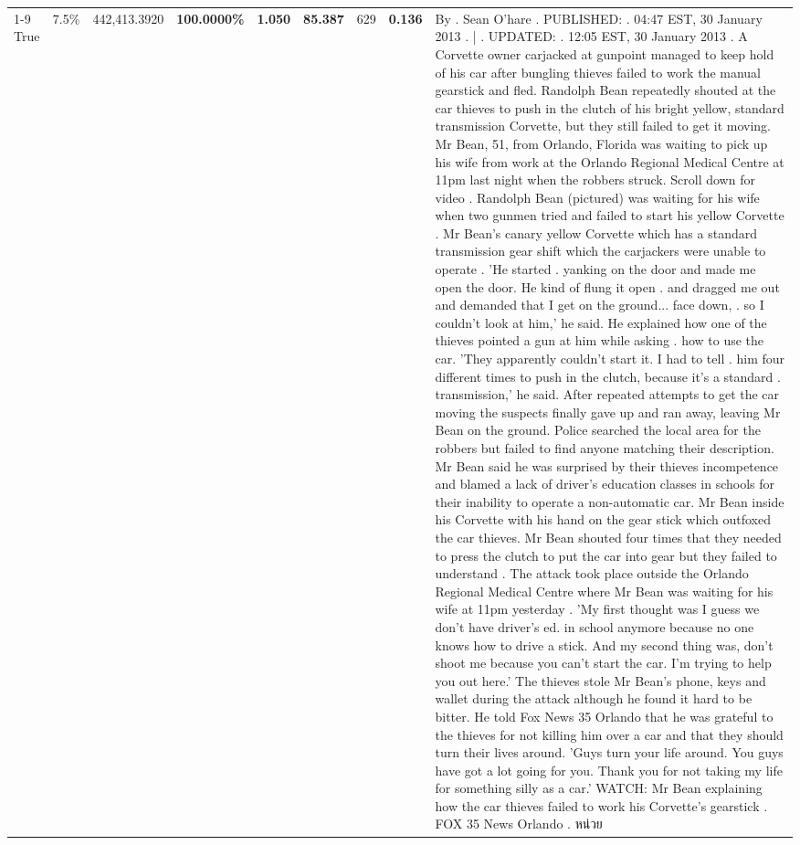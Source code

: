 \begin{table}[H]
\begin{tabular}{lllrlllll}
\cline{1-9} \cline{2-9}
True & 7.5\% & 442,413.3920 & \bfseries \color{red} 100.0000\% & \bfseries \color{red} 1.050 & \bfseries \color{red} 85.387 & 629 & \bfseries \color{red} 0.136 & By . Sean O'hare . PUBLISHED: . 04:47 EST, 30 January 2013 . | . UPDATED: . 12:05 EST, 30 January 2013 . A Corvette owner carjacked at gunpoint managed to keep hold of his car after bungling thieves failed to work the manual gearstick and fled. Randolph Bean repeatedly shouted at the car thieves to push in the clutch of his bright yellow, standard transmission Corvette, but they still failed to get it moving. Mr Bean, 51, from Orlando, Florida was waiting to pick up his wife from work at the Orlando Regional Medical Centre at 11pm last night when the robbers struck. Scroll down for video . Randolph Bean (pictured) was waiting for his wife when two gunmen tried and failed to start his yellow Corvette . Mr Bean's canary yellow Corvette which has a standard transmission gear shift which the carjackers were unable to operate . 'He started . yanking on the door and made me open the door. He kind of flung it open . and dragged me out and demanded that I get on the ground... face down, . so I couldn't look at him,' he said. He explained how one of the thieves pointed a gun at him while asking . how to use the car. 'They apparently couldn't start it. I had to tell . him four different times to push in the clutch, because it's a standard . transmission,' he said. After repeated attempts to get the car moving the suspects finally gave up and ran away, leaving Mr Bean on the ground. Police searched the local area for the robbers but failed to find anyone matching their description. Mr Bean said he was surprised by their thieves incompetence and blamed a lack of driver's education classes in schools for their inability to operate a non-automatic car. Mr Bean inside his Corvette with his hand on the gear stick which outfoxed the car thieves. Mr Bean shouted four times that they needed to press the clutch to put the car into gear but they failed to understand . The attack took place outside the Orlando Regional Medical Centre where Mr Bean was waiting for his wife at 11pm yesterday . 'My first thought was I guess we don't have driver's ed. in school anymore because no one knows how to drive a stick. And my second thing was, don't shoot me because you can't start the car. I'm trying to help you out here.' The thieves stole Mr Bean's phone, keys and wallet during the attack although he found it hard to be bitter. He told Fox News 35 Orlando that he was grateful to the thieves for not killing him over a car and that they should turn their lives around. 'Guys turn your life around. You guys have got a lot going for you. Thank you for not taking my life for something silly as a car.' WATCH: Mr Bean explaining how the car thieves failed to work his Corvette's gearstick . FOX 35 News Orlando . หน่วย \\

\end{tabular}
\end{table}
